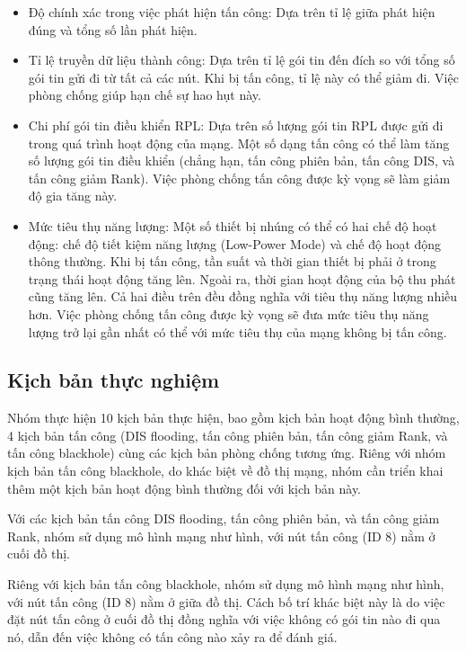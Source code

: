 \begin{itemize}
    \item Độ chính xác trong việc phát hiện tấn công: Dựa trên tỉ lệ giữa phát hiện đúng và tổng số lần phát hiện.
    \item Tỉ lệ truyền dữ liệu thành công: Dựa trên tỉ lệ gói tin đến đích so với tổng số gói tin gửi đi từ tất cả các nút. Khi bị tấn công, tỉ lệ này có thể giảm đi. Việc phòng chống giúp hạn chế sự hao hụt này.
    \item Chi phí gói tin điều khiển RPL: Dựa trên số lượng gói tin RPL được gửi đi trong quá trình hoạt động của mạng. Một số dạng tấn công có thể làm tăng số lượng gói tin điều khiển (chẳng hạn, tấn công phiên bản, tấn công DIS, và tấn công giảm Rank). Việc phòng chống tấn công được kỳ vọng sẽ làm giảm độ gia tăng này.
    \item Mức tiêu thụ năng lượng: Một số thiết bị nhúng có thể có hai chế độ hoạt động: chế độ tiết kiệm năng lượng (Low-Power Mode) và chế độ hoạt động thông thường. Khi bị tấn công, tần suất và thời gian thiết bị phải ở trong trạng thái hoạt động tăng lên. Ngoài ra, thời gian hoạt động của bộ thu phát cũng tăng lên. Cả hai điều trên đều đồng nghĩa với tiêu thụ năng lượng nhiều hơn. Việc phòng chống tấn công được kỳ vọng sẽ đưa mức tiêu thụ năng lượng trở lại gần nhất có thể với mức tiêu thụ của mạng không bị tấn công.
\end{itemize}

\subsection{Kịch bản thực nghiệm}
Nhóm thực hiện 10 kịch bản thực hiện, bao gồm kịch bản hoạt động bình thường, 4 kịch bản tấn công (DIS flooding, tấn công phiên bản, tấn công giảm Rank, và tấn công blackhole) cùng các kịch bản phòng chống tương ứng. Riêng với nhóm kịch bản tấn công blackhole, do khác biệt về đồ thị mạng, nhóm cần triển khai thêm một kịch bản hoạt động bình thường đối với kịch bản này.

Với các kịch bản tấn công DIS flooding, tấn công phiên bản, và tấn công giảm Rank, nhóm sử dụng mô hình mạng như hình, với nút tấn công (ID 8) nằm ở cuối đồ thị.

Riêng với kịch bản tấn công blackhole, nhóm sử dụng mô hình mạng như hình, với nút tấn công (ID 8) nằm ở giữa đồ thị. Cách bố trí khác biệt này là do việc đặt nút tấn công ở cuối đồ thị đồng nghĩa với việc không có gói tin nào đi qua nó, dẫn đến việc không có tấn công nào xảy ra để đánh giá.

